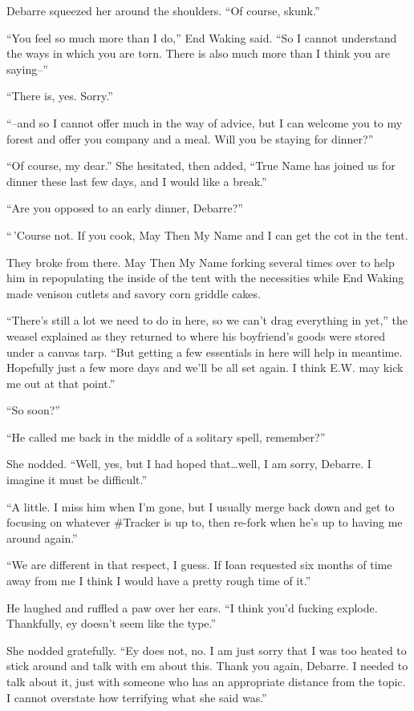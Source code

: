 Debarre squeezed her around the shoulders. ``Of course, skunk.''

``You feel so much more than I do,'' End Waking said. ``So I cannot understand the ways in which you are torn. There is also much more than I think you are saying--''

``There is, yes. Sorry.''

``--and so I cannot offer much in the way of advice, but I can welcome you to my forest and offer you company and a meal. Will you be staying for dinner?''

``Of course, my dear.'' She hesitated, then added, ``True Name has joined us for dinner these last few days, and I would like a break.''

``Are you opposed to an early dinner, Debarre?''

``\,'Course not. If you cook, May Then My Name and I can get the cot in the tent.

They broke from there. May Then My Name forking several times over to help him in repopulating the inside of the tent with the necessities while End Waking made venison cutlets and savory corn griddle cakes.

``There's still a lot we need to do in here, so we can't drag everything in yet,'' the weasel explained as they returned to where his boyfriend's goods were stored under a canvas tarp. ``But getting a few essentials in here will help in meantime. Hopefully just a few more days and we'll be all set again. I think E.W. may kick me out at that point.''

``So soon?''

``He called me back in the middle of a solitary spell, remember?''

She nodded. ``Well, yes, but I had hoped that\ldots well, I am sorry, Debarre. I imagine it must be difficult.''

``A little. I miss him when I'm gone, but I usually merge back down and get to focusing on whatever \#Tracker is up to, then re-fork when he's up to having me around again.''

``We are different in that respect, I guess. If Ioan requested six months of time away from me I think I would have a pretty rough time of it.''

He laughed and ruffled a paw over her ears. ``I think you'd fucking explode. Thankfully, ey doesn't seem like the type.''

She nodded gratefully. ``Ey does not, no. I am just sorry that I was too heated to stick around and talk with em about this. Thank you again, Debarre. I needed to talk about it, just with someone who has an appropriate distance from the topic. I cannot overstate how terrifying what she said was.''

